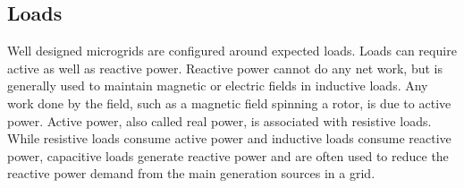 

\subsection{Loads}
Well designed microgrids are configured around expected loads. Loads can require active as well as reactive power. Reactive power cannot do any net work, but is generally used to maintain magnetic or electric fields in inductive loads. Any work done by the field, such as a magnetic field spinning a rotor, is due to active power. Active power, also called real power, is associated with resistive loads. While resistive loads consume active power and inductive loads consume reactive power, capacitive loads generate reactive power and are often used to reduce the reactive power demand from the main generation sources in a grid. 

